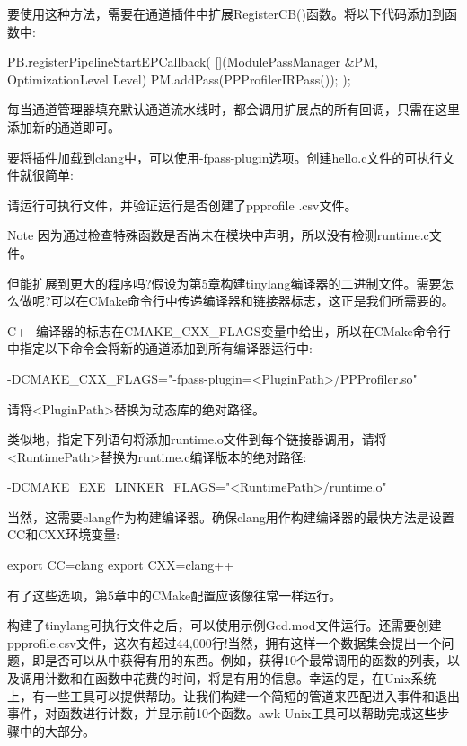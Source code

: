 要使用这种方法，需要在通道插件中扩展RegisterCB()函数。将以下代码添加到函数中:

\begin{cpp}
PB.registerPipelineStartEPCallback(
    [](ModulePassManager &PM, OptimizationLevel Level) {
        PM.addPass(PPProfilerIRPass());
    });
\end{cpp}

每当通道管理器填充默认通道流水线时，都会调用扩展点的所有回调，只需在这里添加新的通道即可。

要将插件加载到clang中，可以使用-fpass-plugin选项。创建hello.c文件的可执行文件就很简单:


请运行可执行文件，并验证运行是否创建了ppprofile .csv文件。

\begin{myNotic}{Note}
因为通过检查特殊函数是否尚未在模块中声明，所以没有检测runtime.c文件。
\end{myNotic}

但能扩展到更大的程序吗?假设为第5章构建tinylang编译器的二进制文件。需要怎么做呢?可以在CMake命令行中传递编译器和链接器标志，这正是我们所需要的。

C++编译器的标志在CMAKE\_CXX\_FLAGS变量中给出，所以在CMake命令行中指定以下命令会将新的通道添加到所有编译器运行中:

\begin{shell}
-DCMAKE_CXX_FLAGS="-fpass-plugin=<PluginPath>/PPProfiler.so"
\end{shell}

请将<PluginPath>替换为动态库的绝对路径。

类似地，指定下列语句将添加runtime.o文件到每个链接器调用，请将<RuntimePath>替换为runtime.c编译版本的绝对路径:

\begin{shell}
-DCMAKE_EXE_LINKER_FLAGS="<RuntimePath>/runtime.o"
\end{shell}

当然，这需要clang作为构建编译器。确保clang用作构建编译器的最快方法是设置CC和CXX环境变量:

\begin{shell}
export CC=clang
export CXX=clang++
\end{shell}

有了这些选项，第5章中的CMake配置应该像往常一样运行。

构建了tinylang可执行文件之后，可以使用示例Gcd.mod文件运行。还需要创建ppprofile.csv文件，这次有超过44,000行!当然，拥有这样一个数据集会提出一个问题，即是否可以从中获得有用的东西。例如，获得10个最常调用的函数的列表，以及调用计数和在函数中花费的时间，将是有用的信息。幸运的是，在Unix系统上，有一些工具可以提供帮助。让我们构建一个简短的管道来匹配进入事件和退出事件，对函数进行计数，并显示前10个函数。awk Unix工具可以帮助完成这些步骤中的大部分。


